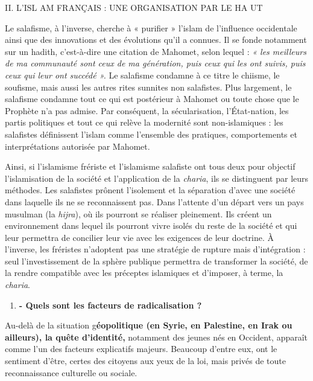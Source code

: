 II. L'ISL AM FRANÇAIS : UNE ORGANISATION PAR LE HA UT

Le salafisme, à l'inverse, cherche à « purifier » l'islam de l'influence
occidentale ainsi que des innovations et des évolutions qu'il a connues.
Il se fonde notamment sur un hadith, c'est-à-dire une citation de
Mahomet, selon lequel : \emph{« les meilleurs de ma communauté sont ceux
de ma génération, puis ceux qui les ont suivis, puis ceux qui leur ont
succédé ».} Le salafisme condamne à ce titre le chiisme, le soufisme,
mais aussi les autres rites sunnites non salafistes. Plus largement, le
salafisme condamne tout ce qui est postérieur à Mahomet ou toute chose
que le Prophète n'a pas admise. Par conséquent, la sécularisation,
l'État-nation, les partis politiques et tout ce qui relève la modernité
sont non-islamiques : les salafistes définissent l'islam comme
l'ensemble des pratiques, comportements et interprétations autorisée par
Mahomet.

Ainsi, si l'islamisme frériste et l'islamisme salafiste ont tous deux
pour objectif l'islamisation de la société et l'application de la
\emph{charia}, ils se distinguent par leurs méthodes. Les salafistes
prônent l'isolement et la séparation d'avec une société dans laquelle
ils ne se reconnaissent pas. Dans l'attente d'un départ vers un pays
musulman (la \emph{hijra}), où ils pourront se réaliser pleinement. Ils
créent un environnement dans lequel ils pourront vivre isolés du reste
de la société et qui leur permettra de concilier leur vie avec les
exigences de leur doctrine. À l'inverse, les fréristes n'adoptent pas
une stratégie de rupture mais d'intégration : seul l'investissement de
la sphère publique permettra de transformer la société, de la rendre
compatible avec les préceptes islamiques et d'imposer, à terme, la
\emph{charia}.




\begin{enumerate}
\def\labelenumi{\arabic{enumi}.}
\setcounter{enumi}{1}
\item
  \textbf{- Quels sont les facteurs de radicalisation ?}
\end{enumerate}


Au-delà de la situation g\textbf{éopolitique (en Syrie, en Palestine, en
Irak ou ailleurs), la quête d'identité,} notamment des jeunes nés en
Occident, apparaît comme l'un des facteurs explicatifs majeurs. Beaucoup
d'entre eux, ont le sentiment d'être, certes des citoyens aux yeux de la
loi, mais privés de toute reconnaissance culturelle ou sociale.

